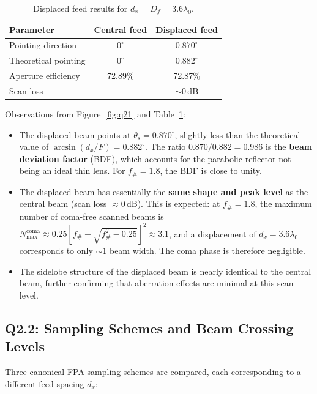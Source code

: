 \documentclass{article}
\begin{document}
\begin{table}[H]
\centering
\caption{Displaced feed results for $d_x = D_f = 3.6\lambda_0$.}
\label{tab:q21}
\begin{tabular}{@{}lcc@{}}
\toprule
Parameter & Central feed & Displaced feed \\
\midrule
Pointing direction & $0^\circ$ & $0.870^\circ$ \\
Theoretical pointing & $0^\circ$ & $0.882^\circ$ \\
Aperture efficiency & 72.89\% & 72.87\% \\
Scan loss & --- & ${\sim}0$\,dB \\
\bottomrule
\end{tabular}
\end{table}

Observations from Figure~\ref{fig:q21} and Table~\ref{tab:q21}:
\begin{itemize}
\item The displaced beam points at $\theta_s = 0.870^\circ$, slightly less than the theoretical value of $\arcsin(d_x/F) = 0.882^\circ$. The ratio $0.870/0.882 = 0.986$ is the \textbf{beam deviation factor} (BDF), which accounts for the parabolic reflector not being an ideal thin lens. For $f_\# = 1.8$, the BDF is close to unity.

\item The displaced beam has essentially the \textbf{same shape and peak level} as the central beam (scan loss $\approx 0$\,dB). This is expected: at $f_\# = 1.8$, the maximum number of coma-free scanned beams is $N_{\max}^{\text{coma}} \approx 0.25\left[f_\# + \sqrt{f_\#^2 - 0.25}\right]^2 \approx 3.1$, and a displacement of $d_x = 3.6\lambda_0$ corresponds to only ${\sim}1$ beam width. The coma phase is therefore negligible.

\item The sidelobe structure of the displaced beam is nearly identical to the central beam, further confirming that aberration effects are minimal at this scan level.
\end{itemize}

\subsection{Q2.2: Sampling Schemes and Beam Crossing Levels}

Three canonical FPA sampling schemes are compared, each corresponding to a different feed spacing $d_x$:
\end{document}
